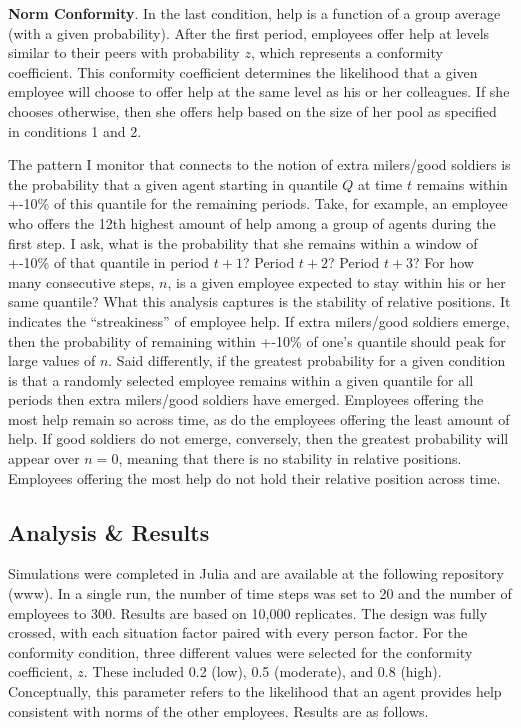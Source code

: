 \documentclass[english,,man]{apa6}
\begin{document}
\textbf{Norm Conformity}. In the last condition, help is a function of a group average (with a given probability). After the first period, employees offer help at levels similar to their peers with probability \(z\), which represents a conformity coefficient. This conformity coefficient determines the likelihood that a given employee will choose to offer help at the same level as his or her colleagues. If she chooses otherwise, then she offers help based on the size of her pool as specified in conditions 1 and 2.

The pattern I monitor that connects to the notion of extra milers/good soldiers is the probability that a given agent starting in quantile \(Q\) at time \(t\) remains within +-10\% of this quantile for the remaining periods. Take, for example, an employee who offers the 12th highest amount of help among a group of agents during the first step. I ask, what is the probability that she remains within a window of +-10\% of that quantile in period \(t + 1\)? Period \(t + 2\)? Period \(t + 3\)? For how many consecutive steps, \(n\), is a given employee expected to stay within his or her same quantile? What this analysis captures is the stability of relative positions. It indicates the \enquote{streakiness} of employee help. If extra milers/good soldiers emerge, then the probability of remaining within +-10\% of one's quantile should peak for large values of \(n\). Said differently, if the greatest probability for a given condition is that a randomly selected employee remains within a given quantile for all periods then extra milers/good soldiers have emerged. Employees offering the most help remain so across time, as do the employees offering the least amount of help. If good soldiers do not emerge, conversely, then the greatest probability will appear over \(n = 0\), meaning that there is no stability in relative positions. Employees offering the most help do not hold their relative position across time.

\hypertarget{analysis-results}{%
\subsection{Analysis \& Results}\label{analysis-results}}

Simulations were completed in Julia and are available at the following repository (www). In a single run, the number of time steps was set to 20 and the number of employees to 300. Results are based on 10,000 replicates. The design was fully crossed, with each situation factor paired with every person factor. For the conformity condition, three different values were selected for the conformity coefficient, \(z\). These included 0.2 (low), 0.5 (moderate), and 0.8 (high). Conceptually, this parameter refers to the likelihood that an agent provides help consistent with norms of the other employees. Results are as follows.
\end{document}
